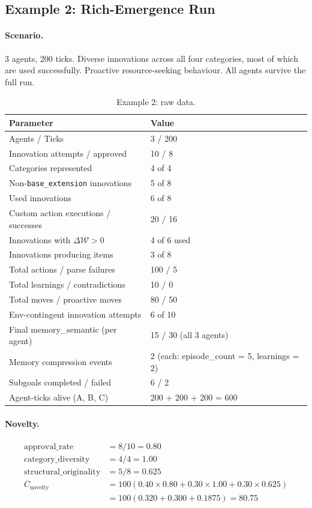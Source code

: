 \documentclass[a4paper, 11pt]{article}
\newcommand{\welfare}{\mathcal{W}}
\begin{document}
\subsection{Example 2: Rich-Emergence Run}

\paragraph{Scenario.} 3 agents, 200 ticks. Diverse innovations across all four categories, most of which are used successfully. Proactive resource-seeking behaviour. All agents survive the full run.

\begin{table}[ht]
\centering
\small
\caption{Example 2: raw data.}
\begin{tabular}{@{}ll@{}}
\toprule
\textbf{Parameter} & \textbf{Value} \\
\midrule
Agents / Ticks & 3 / 200 \\
Innovation attempts / approved & 10 / 8 \\
Categories represented & 4 of 4 \\
Non-\texttt{base\_extension} innovations & 5 of 8 \\
Used innovations & 6 of 8 \\
Custom action executions / successes & 20 / 16 \\
Innovations with $\Delta\welfare > 0$ & 4 of 6 used \\
Innovations producing items & 3 of 8 \\
Total actions / parse failures & 100 / 5 \\
Total learnings / contradictions & 10 / 0 \\
Total moves / proactive moves & 80 / 50 \\
Env-contingent innovation attempts & 6 of 10 \\
Final memory\_semantic (per agent) & 15 / 30 (all 3 agents) \\
Memory compression events & 2 (each: episode\_count = 5, learnings = 2) \\
Subgoals completed / failed & 6 / 2 \\
Agent-ticks alive (A, B, C) & 200 + 200 + 200 = 600 \\
\bottomrule
\end{tabular}
\end{table}

\paragraph{Novelty.}
\begin{align*}
    \text{approval\_rate} &= 8/10 = 0.80 \\
    \text{category\_diversity} &= 4/4 = 1.00 \\
    \text{structural\_originality} &= 5/8 = 0.625 \\
    C_{\text{novelty}} &= 100(0.40 \times 0.80 + 0.30 \times 1.00 + 0.30 \times 0.625) \\
    &= 100(0.320 + 0.300 + 0.1875) = \mathbf{80.75}
\end{align*}
\end{document}
